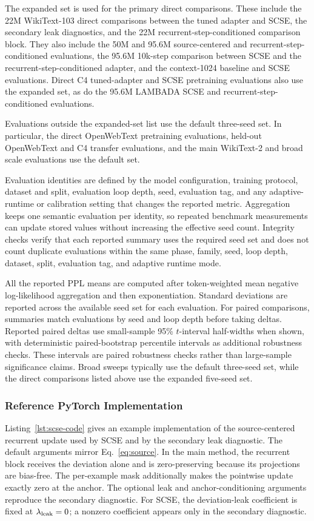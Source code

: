 \documentclass[letterpaper]{article} %
\newcommand{\SCSE}{\textsc{SCSE}}
\theoremstyle{remark}
\begin{document}
The expanded set is used for the primary direct comparisons.  These include the 22M WikiText-103 direct comparisons between the tuned adapter and \SCSE{}, the secondary leak diagnostics, and the 22M recurrent-step-conditioned comparison block.  They also include the 50M and 95.6M source-centered and recurrent-step-conditioned evaluations, the 95.6M 10k-step comparison between \SCSE{} and the recurrent-step-conditioned adapter, and the context-1024 baseline and \SCSE{} evaluations.  Direct C4 tuned-adapter and \SCSE{} pretraining evaluations also use the expanded set, as do the 95.6M LAMBADA \SCSE{} and recurrent-step-conditioned evaluations.

Evaluations outside the expanded-set list use the default three-seed set.  In particular, the direct OpenWebText pretraining evaluations, held-out OpenWebText and C4 transfer evaluations, and the main WikiText-2 and broad scale evaluations use the default set.

Evaluation identities are defined by the model configuration, training protocol, dataset and split, evaluation loop depth, seed, evaluation tag, and any adaptive-runtime or calibration setting that changes the reported metric.  Aggregation keeps one semantic evaluation per identity, so repeated benchmark measurements can update stored values without increasing the effective seed count.  Integrity checks verify that each reported summary uses the required seed set and does not count duplicate evaluations within the same phase, family, seed, loop depth, dataset, split, evaluation tag, and adaptive runtime mode.

All the reported PPL means are computed after token-weighted mean negative log-likelihood aggregation and then exponentiation.  Standard deviations are reported across the available seed set for each evaluation.  For paired comparisons, summaries match evaluations by seed and loop depth before taking deltas.  Reported paired deltas use small-sample 95\% $t$-interval half-widths when shown, with deterministic paired-bootstrap percentile intervals as additional robustness checks.  These intervals are paired robustness checks rather than large-sample significance claims.  Broad sweeps typically use the default three-seed set, while the direct comparisons listed above use the expanded five-seed set.

\subsubsection{Reference PyTorch Implementation}
Listing~\ref{lst:scse-code} gives an example implementation of the source-centered recurrent update used by \SCSE{} and by the secondary leak diagnostic.  The default arguments mirror Eq.~\ref{eq:source}.  In the main method, the recurrent block receives the deviation alone and is zero-preserving because its projections are bias-free.  The per-example mask additionally makes the pointwise update exactly zero at the anchor.  The optional leak and anchor-conditioning arguments reproduce the secondary diagnostic.  For \SCSE{}, the deviation-leak coefficient is fixed at $\lambda_{\rm leak}=0$; a nonzero coefficient appears only in the secondary diagnostic.
\end{document}

